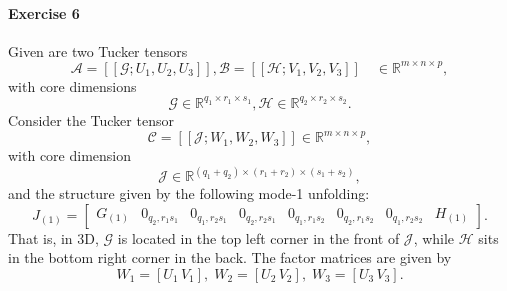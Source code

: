 \documentclass{article}
\begin{document}
\paragraph{Exercise 6}
Given are two Tucker tensors \[\mathcal{A}=[[\mathcal{G}; U_1, U_2,
  U_3]], \mathcal{B}=[[\mathcal{H}; V_1, V_2, V_3]] \quad \in
\mathbb{R}^{m\times n\times p},\] with core dimensions
\[\mathcal{G}\in \mathbb{R}^{q_1\times r_1 \times s_1},
\mathcal{H}\in \mathbb{R}^{q_2\times r_2 \times s_2}.\]
Consider the Tucker tensor \[\mathcal{C}=[[\mathcal{J}; W_1, W_2,
W_3]] \in \mathbb{R}^{m\times n\times p},\] with core dimension
\[\mathcal{J}\in \mathbb{R}^{(q_1+q_2)\times (r_1+r_2) \times (s_1+s_2)},\]
and the structure given by the following mode-1 unfolding:
\[J_{(1)}=
  \begin{bmatrix}G_{(1)} & 0_{q_2, r_1 s_1} & 0_{q_1, r_2
    s_1} & 0_{q_2, r_2 s_1} & 0_{q_1, r_1 s_2} &
    0_{q_2, r_1 s_2} & 0_{q_1, r_2 s_2} & H_{(1)}
\end{bmatrix}.\]
That is, in 3D, \(\mathcal{G}\) is located in the top left corner in
the front of \(\mathcal{J}\), while \(\mathcal{H}\) sits in the bottom
right corner in the back.
The factor matrices are given by
\[W_1 = [U_1 \, V_1],\; W_2 = [U_2 \, V_2], \; W_3 = [U_3 \, V_3].\]
\end{document}
